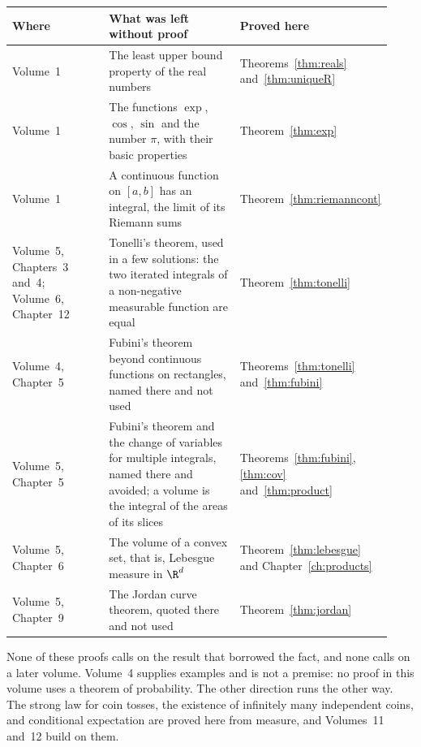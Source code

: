 \begin{center}
\small
\begin{tabular}{@{}p{0.27\linewidth}p{0.38\linewidth}p{0.28\linewidth}@{}}
Where & What was left without proof & Proved here\\\hline
Volume~1 & The least upper bound property of the real numbers & {\raggedright Theorems~\ref{thm:reals} and~\ref{thm:uniqueR}\par}\\
Volume~1 & The functions $\exp$, $\cos$, $\sin$ and the number $\pi$, with their basic properties & {\raggedright Theorem~\ref{thm:exp}\par}\\
Volume~1 & A continuous function on $[a,b]$ has an integral, the limit of its Riemann sums & {\raggedright Theorem~\ref{thm:riemanncont}\par}\\
Volume~5, Chapters~3 and~4; Volume~6, Chapter~12 & Tonelli's theorem, used in a few solutions: the two iterated integrals of a non-negative measurable function are equal & {\raggedright Theorem~\ref{thm:tonelli}\par}\\
Volume~4, Chapter~5 & Fubini's theorem beyond continuous functions on rectangles, named there and not used & {\raggedright Theorems~\ref{thm:tonelli} and~\ref{thm:fubini}\par}\\
Volume~5, Chapter~5 & Fubini's theorem and the change of variables for multiple integrals, named there and avoided; a volume is the integral of the areas of its slices & {\raggedright Theorems~\ref{thm:fubini}, \ref{thm:cov} and~\ref{thm:product}\par}\\
Volume~5, Chapter~6 & The volume of a convex set, that is, Lebesgue measure in $\R^d$ & {\raggedright Theorem~\ref{thm:lebesgue} and Chapter~\ref{ch:products}\par}\\
Volume~5, Chapter~9 & The Jordan curve theorem, quoted there and not used & {\raggedright Theorem~\ref{thm:jordan}\par}\\
\end{tabular}
\end{center}

None of these proofs calls on the result that borrowed the fact, and none calls on a later volume. Volume~4 supplies examples and is not a premise: no proof in this volume uses a theorem of probability. The other direction runs the other way. The strong law for coin tosses, the existence of infinitely many independent coins, and conditional expectation are proved here from measure, and Volumes~11 and~12 build on them.

